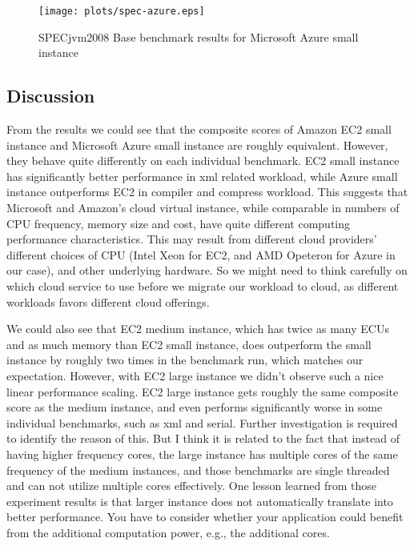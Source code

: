 \begin{figure}
\begin{center}
\texttt{[image: plots/spec-azure.eps]}
\end{center}
\caption{SPECjvm2008 Base benchmark results for Microsoft Azure small instance}
\label{figure:compute-results-azure}
\end{figure}

\subsection{Discussion}
\label{section:benchmarking-discussion}
From the results we could see that the composite scores of Amazon EC2 small instance and Microsoft Azure small instance are roughly equivalent. However, they behave quite differently on each individual benchmark. EC2 small instance has significantly better performance in xml related workload, while Azure small instance outperforms EC2 in compiler and compress workload. This suggests that Microsoft and Amazon's cloud virtual instance, while comparable in numbers of CPU frequency, memory size and cost, have quite different computing performance characteristics. This may result from different cloud providers' different choices of CPU (Intel Xeon for EC2, and AMD Opeteron for Azure in our case), and other underlying hardware. So we might need to think carefully on which cloud service to use before we migrate our workload to cloud, as different workloads favors different cloud offerings. 

We could also see that EC2 medium instance, which has twice as many ECUs and as much memory than EC2 small instance, does outperform the small instance by roughly two times in the benchmark run, which matches our expectation. However, with EC2 large instance we didn't observe such a nice linear performance scaling. EC2 large instance gets roughly the same composite score as the medium instance, and even performs significantly worse in some individual benchmarks, such as xml and serial. Further investigation is required to identify the reason of this. But I think it is related to the fact that instead of having higher frequency cores, the large instance has multiple cores of the same frequency of the medium instances, and those benchmarks are single threaded and can not utilize multiple cores effectively. One lesson learned from those experiment results is that larger instance does not automatically translate into better performance. You have to consider whether your application could benefit from the additional computation power, e.g., the additional cores.
